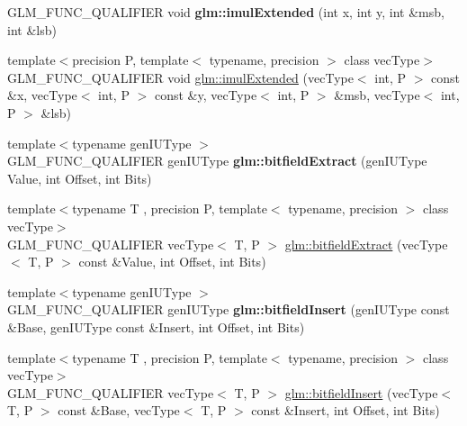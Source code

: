 \begin{DoxyCompactItemize}
\item 
\mbox{\label{func__integer_8inl_a940501aa5c66bc19f9ba6ddfe0110097}} 
G\+L\+M\+\_\+\+F\+U\+N\+C\+\_\+\+Q\+U\+A\+L\+I\+F\+I\+ER void {\bfseries glm\+::imul\+Extended} (int x, int y, int \&msb, int \&lsb)
\item 
{\footnotesize template$<$precision P, template$<$ typename, precision $>$ class vec\+Type$>$ }\\G\+L\+M\+\_\+\+F\+U\+N\+C\+\_\+\+Q\+U\+A\+L\+I\+F\+I\+ER void \hyperlink{group__core__func__integer_ga6e6e8b29ca40d8ca2df10b58ed17d426}{glm\+::imul\+Extended} (vec\+Type$<$ int, P $>$ const \&x, vec\+Type$<$ int, P $>$ const \&y, vec\+Type$<$ int, P $>$ \&msb, vec\+Type$<$ int, P $>$ \&lsb)
\item 
\mbox{\label{func__integer_8inl_ab781f965cc1130fc70a0a8aaf50e6813}} 
{\footnotesize template$<$typename gen\+I\+U\+Type $>$ }\\G\+L\+M\+\_\+\+F\+U\+N\+C\+\_\+\+Q\+U\+A\+L\+I\+F\+I\+ER gen\+I\+U\+Type {\bfseries glm\+::bitfield\+Extract} (gen\+I\+U\+Type Value, int Offset, int Bits)
\item 
{\footnotesize template$<$typename T , precision P, template$<$ typename, precision $>$ class vec\+Type$>$ }\\G\+L\+M\+\_\+\+F\+U\+N\+C\+\_\+\+Q\+U\+A\+L\+I\+F\+I\+ER vec\+Type$<$ T, P $>$ \hyperlink{group__core__func__integer_gab84b88f3a8e367774e5dd1c618c353cf}{glm\+::bitfield\+Extract} (vec\+Type$<$ T, P $>$ const \&Value, int Offset, int Bits)
\item 
\mbox{\label{func__integer_8inl_acec32bd3c6eb5719c5aea5b423085ae6}} 
{\footnotesize template$<$typename gen\+I\+U\+Type $>$ }\\G\+L\+M\+\_\+\+F\+U\+N\+C\+\_\+\+Q\+U\+A\+L\+I\+F\+I\+ER gen\+I\+U\+Type {\bfseries glm\+::bitfield\+Insert} (gen\+I\+U\+Type const \&Base, gen\+I\+U\+Type const \&Insert, int Offset, int Bits)
\item 
{\footnotesize template$<$typename T , precision P, template$<$ typename, precision $>$ class vec\+Type$>$ }\\G\+L\+M\+\_\+\+F\+U\+N\+C\+\_\+\+Q\+U\+A\+L\+I\+F\+I\+ER vec\+Type$<$ T, P $>$ \hyperlink{group__core__func__integer_ga5681dfac9239beb1b8bd995e3c6496d7}{glm\+::bitfield\+Insert} (vec\+Type$<$ T, P $>$ const \&Base, vec\+Type$<$ T, P $>$ const \&Insert, int Offset, int Bits)

\end{DoxyCompactItemize}
